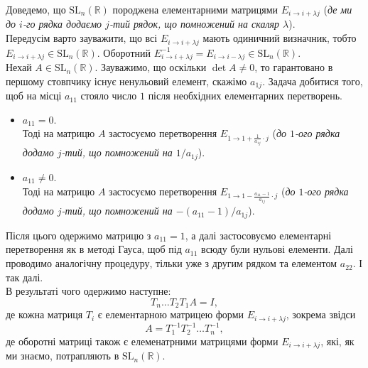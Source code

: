 \documentclass{math_library}
\begin{document}
\begin{example}
\label{SL_n_is_generated_by_row_addition_matrices}
Доведемо, що $\mathrm{SL}_n(\mathbb{R})$ породжена елементарними матрицями $E_{i \to i+\lambda j}$ (\textit{де ми до $i$-го рядка додаємо $j$-тий рядок, що помножений на скаляр $\lambda$}).
\bigskip \\
Передусім варто зауважити, що всі $E_{i \to i+\lambda j}$ мають одиничний визначник, тобто $E_{i \to i+\lambda j} \in \mathrm{SL}_n(\mathbb{R})$. Оборотний $E^{-1}_{i \to i+\lambda j} = E_{i \to i-\lambda j} \in \mathrm{SL}_n(\mathbb{R})$.
\bigskip \\
Нехай $A \in \mathrm{SL}_n(\mathbb{R})$. Зауважимо, що оскільки $\det A \neq 0$, то гарантовано в першому стовпчику існує ненульовий елемент, скажімо $a_{1j}$. Задача добитися того, щоб на місці $a_{11}$ стояло число $1$ після необхідних елементарних перетворень.
\begin{itemize}
\item $a_{11} = 0$.\\
Тоді на матрицю $A$ застосуємо перетворення $E_{1 \to 1+\frac{1}{a_{1j}}\cdot j}$ (\textit{до $1$-ого рядка додамо $j$-тий, що помножений на $1/a_{1j}$}).

\item $a_{11} \neq 0$.\\
Тоді на матрицю $A$ застосуємо перетворення $E_{1 \to 1-\frac{a_{11}-1}{a_{1j}} \cdot j}$ (\textit{до $1$-ого рядка додамо $j$-тий, що помножений на $-(a_{11}-1)/a_{1j}$}).
\end{itemize}
Після цього одержимо матрицю з $a_{11} = 1$, а далі застосовуємо елементарні перетворення як в методі Гауса, щоб під $a_{11}$ всюду були нульові елементи. Далі проводимо аналогічну процедуру, тільки уже з другим рядком та елементом $a_{22}$. І так далі.\\
В результаті чого одержимо наступне:
\[
T_n \dots T_2 T_1 A = I,
\]
де кожна матриця $T_i$ є елементарною матрицею форми $E_{i \to i+\lambda j}$, зокрема звідси
\[
A = T_1^{-1} T_2^{-1} \dots T_n^{-1},
\]
де оборотні матриці також є елеменатрними матрицями форми $E_{i \to i+\lambda j}$, які, як ми знаємо, потрапляють в $\mathrm{SL}_n(\mathbb{R})$.
\end{example}

\iffalse
\begin{example}
Група $\left< S_n, \circ \right>$ породжена транспозиціями (\textit{вправа: довести}).

\end{example}
\fi
\end{document}
